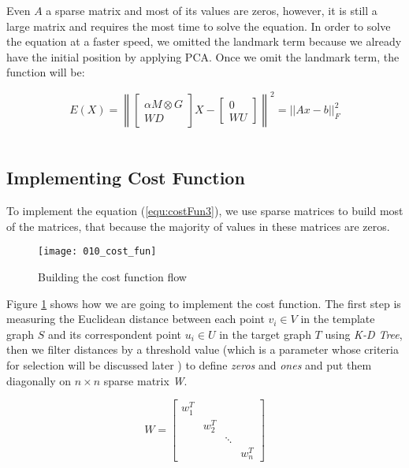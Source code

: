 \documentclass[../structure.tex]{subfiles}
\begin{document}
Even $A$ a sparse matrix and most of its values are zeros, however, it is still a large matrix and requires the most time to solve the equation. In order to solve the equation at a faster speed, we omitted the landmark term because we already have the initial position by applying PCA. Once we omit the landmark term, the function will be:

\begin{equation}
E(X) = \left\|
\begin{bmatrix}
\alpha M \otimes G \\ WD
\end{bmatrix}
X -
\begin{bmatrix}
0 \\ WU
\end{bmatrix}
\right\| ^2
= ||Ax - b||_{F}^2
\label{equ:costFun3}
\end{equation}\\

\subsection{Implementing Cost Function}
\hspace{2em}To implement the equation (\ref{equ:costFun3}), we use sparse matrices to build most of the matrices, that because the majority of values in these matrices are zeros.

\begin{figure}[h!]
\centering
\texttt{[image: 010\_cost\_fun]}
\captionsetup{justification=centering}
\caption{Building the cost function flow}
\label{fig:cost_flow}
\end{figure}

Figure \ref{fig:cost_flow} shows how we are going to implement the cost function. The first step is measuring the Euclidean distance between each point $v_{i}\in V$ in the template graph $S$ and its correspondent point $u_{i}\in U$ in the target graph $T$ using \textit{K-D Tree}, then we filter distances by a threshold value (which is a parameter whose criteria for selection will be discussed later ) to define \textit{zeros} and \textit{ones} and put them diagonally on $n\times n$ sparse matrix \textit{W}.

\begin{equation*}
W =
\begin{bmatrix}
w_{1}^T & & & \\
& w_{2}^T & & \\
& & \ddots & \\
& & & w_{n}^T
\end{bmatrix}
\end{equation*}\\
\end{document}
